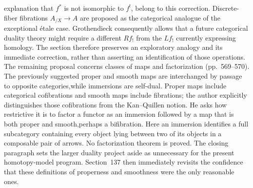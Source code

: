 \documentclass[10pt,oneside]{book}
\begin{document}
explanation that $f^*$ is not isomorphic to $f^!$, belong to this correction. Discrete-fiber fibrations $A_{/X}\to A$ are proposed as the categorical analogue of the exceptional étale case. Grothendieck consequently allows that a future categorical duality theory might require a different $Rf_!$ from the $Lf_!$ currently expressing homology. The section therefore preserves an exploratory analogy and its immediate correction, rather than asserting an identification of those operations. The remaining proposal concerns classes of maps and factorization (pp.~569--570). The previously suggested proper and smooth maps are interchanged by passage to opposite categories,while immersions are self-dual. Proper maps include categorical cofibrations and smooth maps include fibrations; the author explicitly distinguishes those cofibrations from the Kan--Quillen notion. He asks how restrictive it is to factor a functor as an immersion followed by a map that is both proper and smooth,perhaps a bifibration. Here an immersion identifies a full subcategory containing every object lying between two of its objects in a composable pair of arrows. No factorization theorem is proved. The closing paragraph sets the larger duality project aside as unnecessary for the present homotopy-model program. Section~137 then immediately revisits the confidence that these definitions of properness and smoothness were the only reasonable ones.
\end{document}
